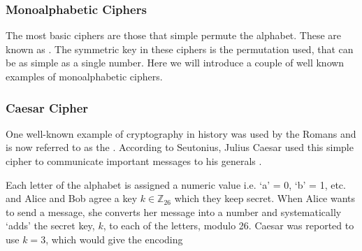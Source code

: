 

\subsubsection{Monoalphabetic Ciphers}

The most basic ciphers are those that simple permute the alphabet. These are known as . The symmetric key in these ciphers is the permutation used, that can be as simple as a single number. Here we will introduce a couple of well known examples of monoalphabetic ciphers. 

\subsubsection*{Caesar Cipher}

One well-known example of cryptography in history was used by the Romans and is now referred to as the . According to Seutonius, Julius Caesar used this simple cipher to communicate important messages to his generals \cite{Suetonius}. 

Each letter of the alphabet is assigned a numeric value i.e. `a' = 0, `b' = 1, etc. and Alice and Bob agree a key $k\in\mathbb{Z}_{26}$ which they keep secret. When Alice wants to send a message, she converts her message into a number and systematically `adds' the secret key, $k$, to each of the letters, modulo 26. Caesar was reported to use $k=3$, which would give the encoding 




